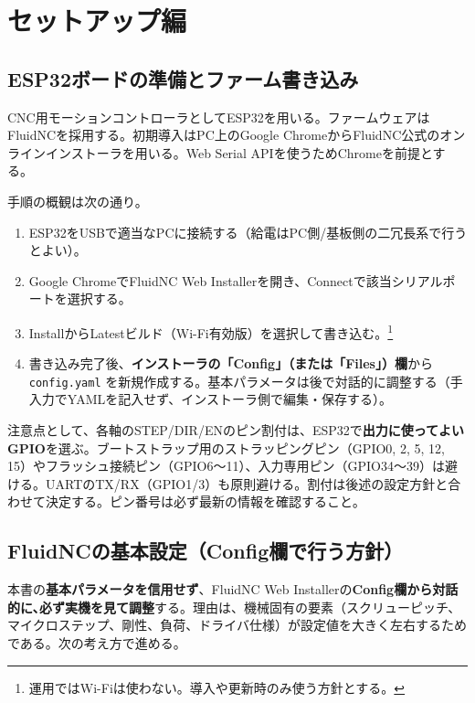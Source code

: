 \documentclass[uplatex,dvipdfmx]{ujarticle}
\begin{document}
\section{セットアップ編}

\subsection{ESP32ボードの準備とファーム書き込み}

CNC用モーションコントローラとしてESP32を用いる。ファームウェアはFluidNCを採用する。初期導入はPC上のGoogle ChromeからFluidNC公式のオンラインインストーラを用いる。Web Serial APIを使うためChromeを前提とする。

手順の概観は次の通り。
\begin{enumerate}
\item ESP32をUSBで適当なPCに接続する（給電はPC側/基板側の二冗長系で行うとよい）。
\item Google ChromeでFluidNC Web Installerを開き、Connectで該当シリアルポートを選択する。
\item InstallからLatestビルド（Wi-Fi有効版）を選択して書き込む。\footnote{運用ではWi-Fiは使わない。導入や更新時のみ使う方針とする。}
\item 書き込み完了後、\textbf{インストーラの「Config」（または「Files」）欄}から \texttt{config.yaml} を新規作成する。基本パラメータは後で対話的に調整する（手入力でYAMLを記入せず、インストーラ側で編集・保存する）。
\end{enumerate}

注意点として、各軸のSTEP/DIR/ENのピン割付は、ESP32で\textbf{出力に使ってよいGPIO}を選ぶ。ブートストラップ用のストラッピングピン（GPIO0, 2, 5, 12, 15）やフラッシュ接続ピン（GPIO6〜11）、入力専用ピン（GPIO34〜39）は避ける。UARTのTX/RX（GPIO1/3）も原則避ける。割付は後述の設定方針と合わせて決定する。ピン番号は必ず最新の情報を確認すること｡



\subsection{FluidNCの基本設定（Config欄で行う方針）}

本書の\textbf{基本パラメータを信用せず}、FluidNC Web Installerの\textbf{Config欄から対話的に､必ず実機を見て調整}する。理由は、機械固有の要素（スクリューピッチ、マイクロステップ、剛性、負荷、ドライバ仕様）が設定値を大きく左右するためである。次の考え方で進める。
\end{document}
